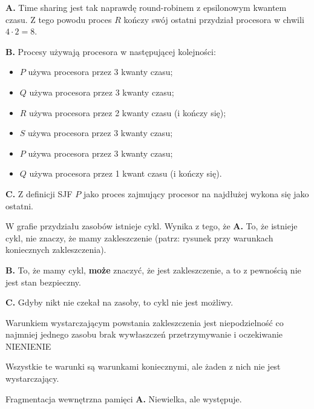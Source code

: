 \begin{solutions}
    \textbf{A.} Time sharing jest tak naprawdę round-robinem z epsilonowym kwantem czasu. Z tego powodu proces $R$ kończy swój ostatni przydział procesora w chwili $4 \cdot 2 = 8$.

    \textbf{B.} Procesy używają procesora w następującej kolejności:
    \begin{itemize}
        \item $P$ używa procesora przez 3 kwanty czasu;
        \item $Q$ używa procesora przez 3 kwanty czasu;
        \item $R$ używa procesora przez 2 kwanty czasu (i kończy się);
        \item $S$ używa procesora przez 3 kwanty czasu;
        \item $P$ używa procesora przez 3 kwanty czasu;
        \item $Q$ używa procesora przez 1 kwant czasu (i kończy się).
    \end{itemize}

    \textbf{C.} Z definicji SJF $P$ jako proces zajmujący procesor na najdłużej wykona się jako ostatni.

    \sol W grafie przydziału zasobów istnieje cykl. Wynika z tego, że
    \textbf{A.} To, że istnieje cykl, nie znaczy, że mamy zakleszczenie (patrz: rysunek przy warunkach koniecznych zakleszczenia).

    \textbf{B.} To, że mamy cykl, \textbf{może} znaczyć, że jest zakleszczenie, a to z pewnością nie jest stan bezpieczny.

    \textbf{C.} Gdyby nikt nie czekał na zasoby, to cykl nie jest możliwy.

    \sol Warunkiem wystarczającym powstania zakleszczenia jest
    \answerss
    {niepodzielność co najmniej jednego zasobu}
    {brak wywłaszczeń}
    {przetrzymywanie i oczekiwanie}
    {NIE}{NIE}{NIE}
    
    Wszystkie te warunki są warunkami koniecznymi, ale żaden z nich nie jest wystarczający.

    \sol Fragmentacja wewnętrzna pamięci
    \textbf{A.} Niewielka, ale występuje.


\end{solutions}
